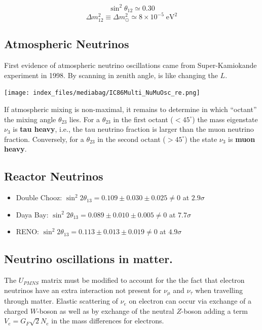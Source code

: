 \documentclass[
  letterpaper,
  DIV=11,
  numbers=noendperiod]{scrreprt}
\providecommand{\tightlist}{%
  \setlength{\itemsep}{0pt}\setlength{\parskip}{0pt}}\usepackage{longtable,booktabs,array}
\begin{document}
\[\sin^2 \theta_{12} \simeq 0.30\]
\[\Delta m_{12}^2 \equiv \Delta m_{\odot}^2 \simeq 8 \times 10^{-5} \mathrm{ \; eV^2}\]

\subsection*{Atmospheric Neutrinos}\label{atmospheric-neutrinos}

First evidence of atmospheric neutrino oscillations came from
Super-Kamiokande experiment in 1998. By scanning in zenith angle, is
like changing the \(L\).

\texttt{[image: index\_files/mediabag/IC86Multi\_NuMuOsc\_re.png]}

If atmospheric mixing is non-maximal, it remains to determine in which
``octant'' the mixing angle \(\theta_{23}\) lies. For a \(\theta_{23}\)
in the first octant (\(< 45^{\circ}\)) the mass eigenstate \(\nu_3\) is
\textbf{tau heavy}, i.e., the tau neutrino fraction is larger than the
muon neutrino fraction. Conversely, for a \(\theta_{23}\) in the second
octant (\(> 45^{\circ}\)) the state \(\nu_3\) is \textbf{muon heavy}.

\subsection*{Reactor Neutrinos}\label{reactor-neutrinos}

\begin{itemize}
\tightlist
\item
  Double Chooz:
  \(\sin^2 2\theta_{13} = 0.109 \pm 0.030 \pm 0.025 \neq 0\) at
  \(2.9\sigma\)
\item
  Daya Bay: \(\sin^2 2\theta_{13} = 0.089 \pm 0.010 \pm 0.005 \neq 0\)
  at \(7.7\sigma\)
\item
  RENO: \(\sin^2 2\theta_{13} = 0.113 \pm 0.013 \pm 0.019 \neq 0\) at
  \(4.9\sigma\)
\end{itemize}

\subsection*{Neutrino oscillations in
matter.}\label{neutrino-oscillations-in-matter.}

The \(U_{PMNS}\) matrix must be modified to account for the the fact
that electron neutrinos have an extra interaction not present for
\(\nu_\mu\) and \(\nu_\tau\) when travelling through matter. Elastic
scattering of \(\nu_e\) on electron can occur via exchange of a charged
\(W\)-boson as well as by exchange of the neutral \(Z\)-boson adding a
term \(V_e = G_F \sqrt{2}N_e\) in the mass differences for electrons.
\end{document}
